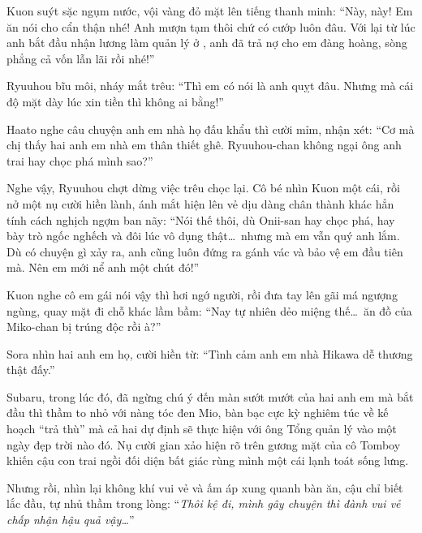 \documentclass[../main.tex]{subfiles}
\begin{document}
Kuon suýt sặc ngụm nước, vội vàng đỏ mặt lên tiếng thanh minh: ``Này, này! Em ăn nói cho cẩn thận nhé! Anh mượn tạm thôi chứ có cướp luôn đâu. Với lại từ lúc anh bắt đầu nhận lương làm quản lý ở \hll, anh đã trả nợ cho em đàng hoàng, sòng phẳng cả vốn lẫn lãi rồi nhé!''

Ryuuhou bĩu môi, nháy mắt trêu: ``Thì em có nói là anh quỵt đâu. Nhưng mà cái độ mặt dày lúc xin tiền thì không ai bằng!''

Haato nghe câu chuyện anh em nhà họ đấu khẩu thì cười mỉm, nhận xét: ``Cơ mà chị thấy hai anh em nhà em thân thiết ghê. Ryuuhou-chan không ngại ông anh trai hay chọc phá mình sao?''

Nghe vậy, Ryuuhou chợt dừng việc trêu chọc lại. Cô bé nhìn Kuon một cái, rồi nở một nụ cười hiền lành, ánh mắt hiện lên vẻ dịu dàng chân thành khác hẳn tính cách nghịch ngợm ban nãy: ``Nói thế thôi, dù Onii-san hay chọc phá, hay bày trò ngốc nghếch và đôi lúc vô dụng thật\dots\ nhưng mà em vẫn quý anh lắm. Dù có chuyện gì xảy ra, anh cũng luôn đứng ra gánh vác và bảo vệ em đầu tiên mà. Nên em mới nể anh một chút đó!''

Kuon nghe cô em gái nói vậy thì hơi ngớ người, rồi đưa tay lên gãi má ngượng ngùng, quay mặt đi chỗ khác lầm bầm: ``Nay tự nhiên dẻo miệng thế\dots\ ăn đồ của Miko-chan bị trúng độc rồi à?''

Sora nhìn hai anh em họ, cười hiền từ: ``Tình cảm anh em nhà Hikawa dễ thương thật đấy.''

Subaru, trong lúc đó, đã ngừng chú ý đến màn sướt mướt của hai anh em mà bắt đầu thì thầm to nhỏ với nàng tóc đen Mio, bàn bạc cực kỳ nghiêm túc về kế hoạch ``trả thù'' mà cả hai dự định sẽ thực hiện với ông Tổng quản lý vào một ngày đẹp trời nào đó. Nụ cười gian xảo hiện rõ trên gương mặt của cô Tomboy khiến cậu con trai ngồi đối diện bất giác rùng mình một cái lạnh toát sống lưng.

Nhưng rồi, nhìn lại không khí vui vẻ và ấm áp xung quanh bàn ăn, cậu chỉ biết lắc đầu, tự nhủ thầm trong lòng: ``\textit{Thôi kệ đi, mình gây chuyện thì đành vui vẻ chấp nhận hậu quả vậy\dots}''
\end{document}
